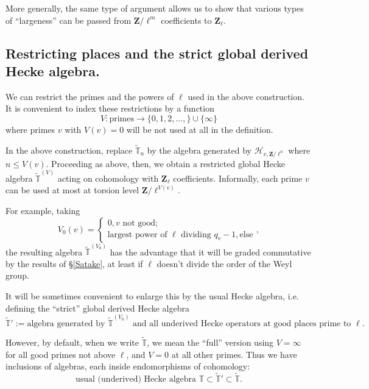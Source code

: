 \documentclass[10pt]{amsart}
\newcommand{\changecolor}{black}
\newcommand{\Z}{\mathbf{Z}}
\newcommand{\gHecke}{\tilde{\mathbb{T}}}
\newcommand{\dHecke}{\mathscr{H}}
\theoremstyle{remark}
\begin{document}
  
 More generally, the same type of argument allows us to show that various types of ``largeness''
  can be passed from $\Z/\ell^m$ coefficients to $\Z_{\ell}$.   
    {\color{\changecolor} 

  \subsection{Restricting places and the strict global derived Hecke algebra.} \label{Hecke:resplace} 
   We can restrict the primes and the powers of $\ell$ used in the above construction.
It is convenient to index these restrictions by a function
  $$V: \mbox{primes} \longrightarrow \{0, 1, 2, \dots, \} \cup \{\infty\}$$
  where primes $v$ with $V(v) = 0$ will be not used at all in the definition.
  
   In the above construction, replace $\widetilde{\mathbb{T}}_n$
   by the algebra generated by $\dHecke_{v, \Z/\ell^n}$ where $n \leq V(v)$. 
   Proceeding as above, then,  we obtain a  restricted global Hecke algebra $\gHecke^{(V)}$
   acting on cohomology with $\Z_{\ell}$ coefficients. Informally, 
  each prime $v$ can be used at most at torsion level $\Z/\ell^{V(v)}$. 
   
   For example, taking
\begin{equation} \label{VV0} V_0(v) = \begin{cases} 0, v \mbox{ not good}; \\ 
   \mbox{largest power of $\ell$ dividing $q_v-1$}, \mbox{else}     \end{cases},\end{equation}
      the resulting algebra $\gHecke^{(V_0)}$ has the advantage that
   it will be graded commutative by the results of       \S \ref{Satake},
   at least if $\ell$ doesn't divide the order of the Weyl group. \index{$\gHecke^{(V)}$} \index{$\gHecke^{(V_0)}$}
   


    It will be sometimes convenient to enlarge this by the usual Hecke algebra, i.e. defining the ``strict'' global derived Hecke algebra
   $$ \gHecke' :=  \mbox{algebra generated by $\gHecke^{(V_0)}$ and all  underived Hecke operators at good places prime to $\ell$.}$$
  
    However, by default, when we write $\gHecke$, we mean the ``full'' version using $V=\infty$ for all good primes not above $\ell$,
   and $V=0$ at all other primes. 
   Thus we have inclusions of algebras, each inside endomorphisms of cohomology:   
   $$\mbox{usual (underived) Hecke algebra $\mathbb{T}$} \subset  \gHecke' \subset \gHecke.$$ 
   

}
\end{document}
